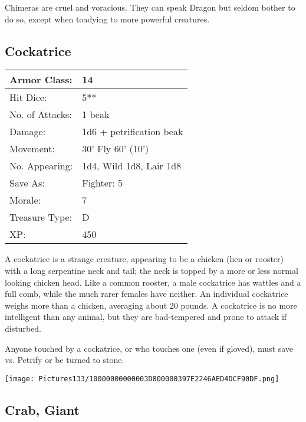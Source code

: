 \documentclass[a4paper,twoside,openany,10pt]{book}
\begin{document}
\begin{multicols}{2}
Chimeras are cruel and voracious. They can speak Dragon but seldom bother to do so, except when toadying to more powerful creatures.

\subsection*{Cockatrice}\label{cockatrice}


\begin{tabularx}{0.48\textwidth}{@{}lX@{}}
Armor Class: & 14 \\\hline
Hit Dice: & 5** \\\hline
No. of Attacks: & 1 beak \\\hline
Damage: & 1d6 + petrification beak \\\hline
Movement: & 30' Fly 60'
(10') \\\hline
No. Appearing: & 1d4, Wild 1d8, Lair 1d8 \\\hline
Save As: & Fighter: 5 \\\hline
Morale: & 7 \\\hline
Treasure Type: & D \\\hline
XP: & 450 \\\hline
\end{tabularx}\medskip

A cockatrice is a strange creature, appearing to be a chicken (hen or rooster) with a long serpentine neck and tail; the neck is topped by a more or less normal looking chicken head. Like a common rooster, a male cockatrice has wattles and a full comb, while the much rarer females have neither. An individual cockatrice weighs more than a chicken, averaging about 20 pounds. A cockatrice is no more intelligent than any animal, but they are bad-tempered and prone to attack if disturbed.

Anyone touched by a cockatrice, or who touches one (even if gloved), must save vs. Petrify or be turned to stone.

\begin{center}
	\texttt{[image: Pictures133/10000000000003D800000397E2246AED4DCF90DF.png]}
\end{center}


\subsection*{Crab, Giant}\label{crab-giant}


\end{multicols}
\end{document}
